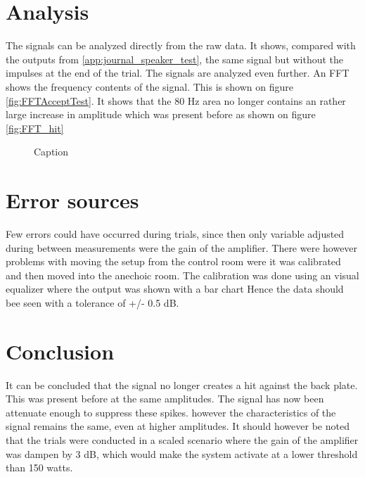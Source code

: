 \section{Analysis}

The signals can be analyzed directly from the raw data. It shows, compared with the outputs from \autoref{app:journal_speaker_test}, the same signal but without the impulses at the end of the trial. The signals are analyzed even further. An FFT shows the frequency contents of the signal. This is shown on figure \autoref{fig:FFTAcceptTest}. It shows that the 80 Hz area no longer contains an rather large increase in amplitude which was present before as shown on figure \ref{fig:FFT_hit}

\begin{figure}[H]
	\centering
	
	\caption{Caption }
	\label{fig:FFTAcceptTest}
\end{figure}

\section{Error sources}

Few errors could have occurred during trials, since then only variable adjusted during between measurements were the gain of the amplifier. There were however problems with moving the setup from the control room were it was calibrated and then moved into the anechoic room. The calibration was done using an visual equalizer where the output was shown with a bar chart Hence the data should bee seen with a tolerance of +/- 0.5 dB.


\section{Conclusion}

It can be concluded that the signal no longer creates a hit against the back plate. This was present before at the same amplitudes. The signal has now been attenuate enough to suppress these spikes. however the characteristics of the signal remains the same, even at higher amplitudes. It should however be noted that the trials were conducted in a scaled scenario where the gain of the amplifier was dampen by 3 dB, which would make the system activate at a lower threshold than 150 watts.  
